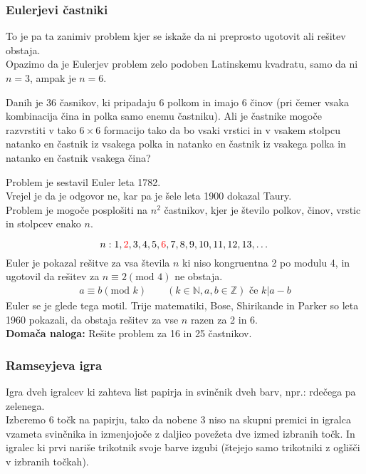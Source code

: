 \documentclass[12pt]{article}
\begin{document}
\subsubsection{Eulerjevi častniki}
To je pa ta zanimiv problem kjer se iskaže da ni preprosto ugotovit ali rešitev obstaja. \\
Opazimo da je Eulerjev problem zelo podoben Latinskemu kvadratu, samo da ni $n = 3$, ampak je $n = 6$.
\begin{center}
\end{center}
Danih je 36 časnikov, ki pripadaju 6 polkom in imajo 6 činov (pri čemer vsaka kombinacija čina in polka samo enemu častniku). Ali je častnike mogoče razvrstiti v tako $6 \times 6$ formacijo tako da bo vsaki vrstici in v vsakem stolpcu natanko en častnik iz vsakega polka in natanko en častnik iz vsakega polka in natanko en častnik vsakega čina?
\begin{center}
\end{center}
Problem je sestavil Euler leta 1782. \\
Vrejel je da je odgovor ne, kar pa je šele leta 1900 dokazal Taury. \\
Problem je mogoče posplošiti na $n^2$ častnikov, kjer je število polkov, činov, vrstic in stolpcev enako $n$.
\begin{center}
    
\end{center}
$$
n: 1, \textcolor{red}{2}, 3, 4, 5, \textcolor{red}{6}, 7, 8, 9, 10, 11, 12, 13,\dots
$$
Euler je pokazal rešitve za vsa števila $n$ ki niso kongruentna 2 po modulu 4, in ugotovil da rešitev za $n \equiv 2 (\text{mod } 4)$ ne obstaja.
\begin{align*}
    a \equiv b (\text{mod } k) \text{ } \text{ } \text{ } (k \in \mathbb{N}, a,b \in \mathbb{Z}) \text{ če } k | a - b
\end{align*}
Euler se je glede tega motil. Trije matematiki, Bose, Shirikande in Parker so leta 1960 pokazali, da obstaja rešitev za vse $n$ razen za 2 in 6. \\

\noindent
\textbf{Domača naloga:} Rešite problem za 16 in 25 častnikov.

\subsubsection{Ramseyjeva igra}
\begin{center}
    
\end{center}
Igra dveh igralcev ki zahteva list papirja in svinčnik dveh barv, npr.: rdečega pa zelenega. \\
Izberemo 6 točk na papirju, tako da nobene 3 niso na skupni premici in igralca vzameta svinčnika in izmenjojoče z daljico povežeta dve izmed izbranih točk. In igralec ki prvi nariše trikotnik svoje barve izgubi (štejejo samo trikotniki z oglišči v izbranih točkah). \\
\end{document}
